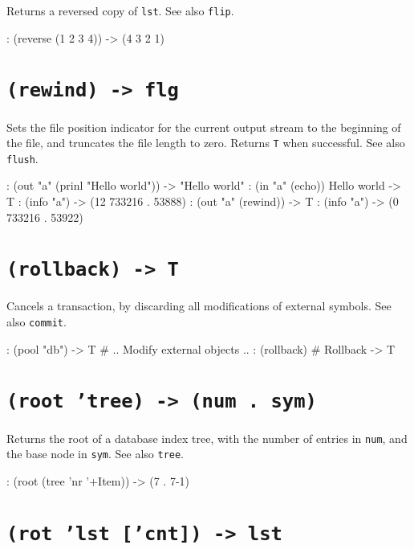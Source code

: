 Returns a reversed copy of \texttt{lst}. See also \texttt{flip}.


\begin{wideverbatim}
: (reverse (1 2 3 4))
-> (4 3 2 1)
\end{wideverbatim}

 
\section*{\texttt{(rewind) -> flg}}
\label{sec:func-ref-R-(rewind) -> flg}


Sets the file position indicator for the current output stream to the
beginning of the file, and truncates the file length to zero. Returns
\texttt{T} when successful. See also \texttt{flush}.


\begin{wideverbatim}
: (out "a" (prinl "Hello world"))
-> "Hello world"
: (in "a" (echo))
Hello world
-> T
: (info "a")
-> (12 733216 . 53888)
: (out "a" (rewind))
-> T
: (info "a")
-> (0 733216 . 53922)
\end{wideverbatim}

 
\section*{\texttt{(rollback) -> T}}
\label{sec:func-ref-R-(rollback) -> T}


Cancels a transaction, by discarding all modifications of external
symbols. See also \texttt{commit}.


\begin{wideverbatim}
: (pool "db")
-> T
# .. Modify external objects ..
: (rollback)            # Rollback
-> T
\end{wideverbatim}

 
\section*{\texttt{(root 'tree) -> (num . sym)}}
\label{sec:func-ref-R-(root 'tree) -> (num . sym)}


Returns the root of a database index tree, with the number of entries in
\texttt{num}, and the base node in \texttt{sym}. See also \texttt{tree}.


\begin{wideverbatim}
: (root (tree 'nr '+Item))
-> (7 . {7-1})
\end{wideverbatim}

 
\section*{\texttt{(rot 'lst ['cnt]) -> lst}}
\label{sec:func-ref-R-(rot 'lst ['cnt]) -> lst}


